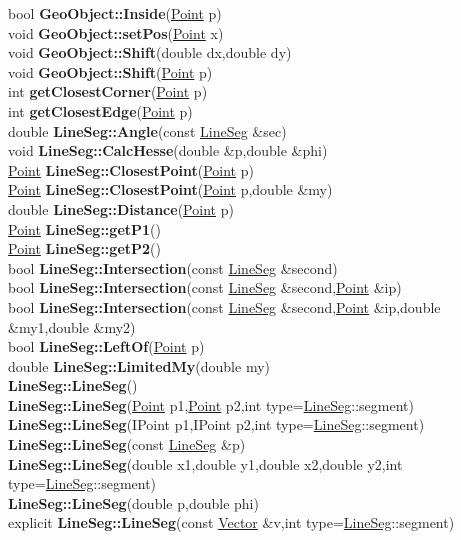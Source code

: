 \documentclass[10pt,titlepage]{article}
\def\functionlistentry#1#2#3#4#5#6{\noindent #1 {\bf #2}(#3) \dotfill #6\\}
\begin{document}
{{\functionlistentry{bool}{GeoObject::Inside}{\hyperlink{Point}{Point} p}{513}{geoObject}{}
\functionlistentry{void}{GeoObject::setPos}{\hyperlink{Point}{Point} x}{504}{geoObject}{}
\functionlistentry{void}{GeoObject::Shift}{double dx,double dy}{505}{geoObject}{}
\functionlistentry{void}{GeoObject::Shift}{\hyperlink{Point}{Point} p}{506}{geoObject}{}
\functionlistentry{int}{getClosestCorner}{\hyperlink{Point}{Point} p}{605}{geoObject}{}
\functionlistentry{int}{getClosestEdge}{\hyperlink{Point}{Point} p}{606}{geoObject}{}
\functionlistentry{double}{LineSeg::Angle}{const \hyperlink{LineSeg}{LineSeg} \&sec}{570}{geoObject}{}
\functionlistentry{void}{LineSeg::CalcHesse}{double \&p,double \&phi}{566}{geoObject}{}
\functionlistentry{\hyperlink{Point}{Point}}{LineSeg::ClosestPoint}{\hyperlink{Point}{Point} p}{573}{geoObject}{}
\functionlistentry{\hyperlink{Point}{Point}}{LineSeg::ClosestPoint}{\hyperlink{Point}{Point} p,double \&my}{574}{geoObject}{}
\functionlistentry{double}{LineSeg::Distance}{\hyperlink{Point}{Point} p}{575}{geoObject}{}
\functionlistentry{\hyperlink{Point}{Point}}{LineSeg::getP1}{}{558}{geoObject}{}
\functionlistentry{\hyperlink{Point}{Point}}{LineSeg::getP2}{}{559}{geoObject}{}
\functionlistentry{bool}{LineSeg::Intersection}{const \hyperlink{LineSeg}{LineSeg} \&second}{576}{geoObject}{}
\functionlistentry{bool}{LineSeg::Intersection}{const \hyperlink{LineSeg}{LineSeg} \&second,\hyperlink{Point}{Point} \&ip}{577}{geoObject}{}
\functionlistentry{bool}{LineSeg::Intersection}{const \hyperlink{LineSeg}{LineSeg} \&second,\hyperlink{Point}{Point} \&ip,double \&my1,double \&my2}{578}{geoObject}{}
\functionlistentry{bool}{LineSeg::LeftOf}{\hyperlink{Point}{Point} p}{572}{geoObject}{}
\functionlistentry{double}{LineSeg::LimitedMy}{double my}{565}{geoObject}{}
\functionlistentry{}{LineSeg::LineSeg}{}{550}{geoObject}{}
\functionlistentry{}{LineSeg::LineSeg}{\hyperlink{Point}{Point} p1,\hyperlink{Point}{Point} p2,int type=\hyperlink{LineSeg}{LineSeg}::segment}{551}{geoObject}{}
\functionlistentry{}{LineSeg::LineSeg}{IPoint p1,IPoint p2,int type=\hyperlink{LineSeg}{LineSeg}::segment}{552}{geoObject}{}
\functionlistentry{}{LineSeg::LineSeg}{const \hyperlink{LineSeg}{LineSeg} \&p}{553}{geoObject}{}
\functionlistentry{}{LineSeg::LineSeg}{double x1,double y1,double x2,double y2,int type=\hyperlink{LineSeg}{LineSeg}::segment}{554}{geoObject}{}
\functionlistentry{}{LineSeg::LineSeg}{double p,double phi}{555}{geoObject}{}
\functionlistentry{explicit}{LineSeg::LineSeg}{const \hyperlink{Vector}{Vector} \&v,int type=\hyperlink{LineSeg}{LineSeg}::segment}{556}{geoObject}{}
}}
\end{document}
